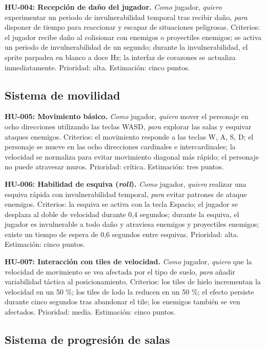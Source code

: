 \textbf{HU-004: Recepción de daño del jugador.}
\textit{Como} jugador, \textit{quiero} experimentar un periodo de invulnerabilidad temporal tras recibir daño, \textit{para} disponer de tiempo para reaccionar y escapar de situaciones peligrosas. Criterios: el jugador recibe daño al colisionar con enemigos o proyectiles enemigos; se activa un periodo de invulnerabilidad de un segundo; durante la invulnerabilidad, el sprite parpadea en blanco a doce Hz; la interfaz de corazones se actualiza inmediatamente. Prioridad: alta. Estimación: cinco puntos.

\subsection{Sistema de movilidad}


\textbf{HU-005: Movimiento básico.}
\textit{Como} jugador, \textit{quiero} mover el personaje en ocho direcciones utilizando las teclas WASD, \textit{para} explorar las salas y esquivar ataques enemigos. Criterios: el movimiento responde a las teclas W, A, S, D; el personaje se mueve en las ocho direcciones cardinales e intercardinales; la velocidad se normaliza para evitar movimiento diagonal más rápido; el personaje no puede atravesar muros. Prioridad: crítica. Estimación: tres puntos.

\textbf{HU-006: Habilidad de esquiva (\textit{roll}).}
\textit{Como} jugador, \textit{quiero} realizar una esquiva rápida con invulnerabilidad temporal, \textit{para} evitar patrones de ataque enemigos. Criterios: la esquiva se activa con la tecla Espacio; el jugador se desplaza al doble de velocidad durante 0,4 segundos; durante la esquiva, el jugador es invulnerable a todo daño y atraviesa enemigos y proyectiles enemigos; existe un tiempo de espera de 0,6 segundos entre esquivas. Prioridad: alta. Estimación: cinco puntos.

\textbf{HU-007: Interacción con tiles de velocidad.}
\textit{Como} jugador, \textit{quiero} que la velocidad de movimiento se vea afectada por el tipo de suelo, \textit{para} añadir variabilidad táctica al posicionamiento. Criterios: los tiles de hielo incrementan la velocidad en un 50 \%; los tiles de lodo la reducen en un 50 \%; el efecto persiste durante cinco segundos tras abandonar el tile; los enemigos también se ven afectados. Prioridad: media. Estimación: cinco puntos.

\subsection{Sistema de progresión de salas}


